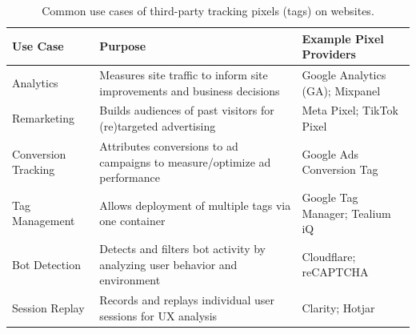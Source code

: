 \begin{table}[ht]\small
\centering
\caption{Common use cases of third-party tracking pixels (tags) on websites.}
\label{tab:tracking-tags-usecases}
\renewcommand{\arraystretch}{1.3} %
\begin{tabular}{@{}p{2.65cm} p{9.7cm} p{4.6cm}@{}}
\toprule
\textbf{Use Case} & \textbf{Purpose} & \textbf{Example Pixel Providers} \\
\midrule
Analytics & Measures site traffic to inform site improvements and business decisions & Google Analytics (GA); Mixpanel \\[4pt]
\hline
Remarketing & Builds audiences of past visitors for (re)targeted advertising & Meta Pixel; TikTok Pixel \\[4pt]
\hline
Conversion Tracking & Attributes conversions to ad campaigns to measure/optimize ad performance & Google Ads Conversion Tag \\[4pt]
\hline
Tag Management & Allows deployment of multiple tags via one container & Google Tag Manager; Tealium iQ \\[4pt]
\hline
Bot Detection & Detects and filters bot activity by analyzing user behavior and environment & Cloudflare; reCAPTCHA \\[4pt]
\hline
Session Replay & Records and replays individual user sessions for UX analysis & Clarity; Hotjar \\
\bottomrule
\end{tabular}
\end{table}
